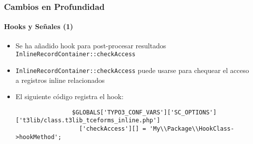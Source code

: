 \begin{frame}[fragile]
	\frametitle{Cambios en Profundidad}
	\framesubtitle{Hooks y Señales (1)}

	\lstset{basicstyle=\tiny\ttfamily}

	\begin{itemize}

		\item Se ha añadido hook para post-procesar resultados \texttt{InlineRecordContainer::checkAccess}

		\item \texttt{InlineRecordContainer::checkAccess} puede usarse para chequear el acceso a registros inline relacionados

		\item El siguiente código registra el hook:

			\begin{lstlisting}
				$GLOBALS['TYPO3_CONF_VARS']['SC_OPTIONS']['t3lib/class.t3lib_tceforms_inline.php']
				  ['checkAccess'][] = 'My\\Package\\HookClass->hookMethod';
			\end{lstlisting}

	\end{itemize}

\end{frame}


